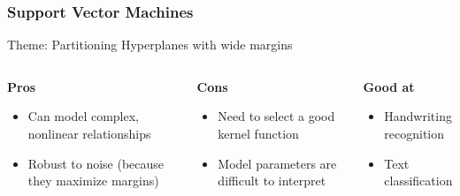 \begin{frame}\frametitle{Support Vector
Machines}
Theme: Partitioning Hyperplanes with wide margins

   \begin{columns}[t]
    \begin{column}{0.3\linewidth}
	\textbf{Pros}
		\begin{itemize}
		\item  Can model complex, nonlinear relationships
		\item Robust to noise (because they maximize
margins)
		\end{itemize}
    \end{column}
    \begin{column}{0.3\linewidth}
	\textbf{Cons}
			\begin{itemize}
		\item   Need to select a good kernel function
		\item  Model parameters are difficult to interpret
		\end{itemize}
    \end{column}
	
    \begin{column}{0.3\linewidth}
	\textbf{Good at}
			\begin{itemize}
		\item   Handwriting recognition
		\item  Text classification
		\end{itemize}
    \end{column}
	
  \end{columns}
\end{frame}


